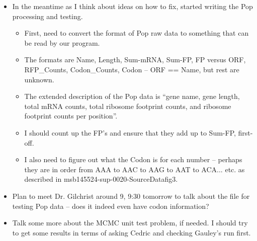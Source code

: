 \documentclass[12pt,hyperref]{labbook}
\newcommand{\sep}{\discretionary{}{}{}} %
\begin{document}
\begin{itemize}
    \item In the meantime as I think about ideas on how to fix, started writing the Pop processing and testing.
    \begin{itemize}
        \item First, need to convert the format of Pop raw data to something that can be read by our program.
        \item The formats are Name, Length, Sum\sep -\sep mRNA, Sum\sep -\sep FP, FP versus ORF, RFP\sep \_\sep Counts, Codon\sep \_\sep Counts, Codon -- ORF == Name, but rest are unknown.
        \item The extended description of the Pop data is \enquote{gene name, gene length, total mRNA counts, total ribosome footprint counts, and ribosome footprint counts per position}.
        \item I should count up the FP's and ensure that they add up to Sum-FP, first-off.
        \item I also need to figure out what the Codon is for each number -- perhaps they are in order from AAA to AAC to AAG to AAT to ACA... etc. as described in msb145524-sup-0020-SourceDatafig3.
    \end{itemize}
    \item Plan to meet Dr. Gilchrist around 9, 9:30 tomorrow to talk about the file for testing Pop data -- does it indeed even have codon information?
    \item Talk some more about the MCMC unit test problem, if needed.
    I should try to get some results in terms of asking Cedric and checking Gauley's run first.
\end{itemize}

\end{document}
